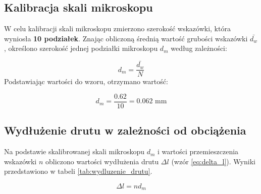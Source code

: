 \documentclass[a4paper,12pt]{article}
\begin{document}
\subsection{Kalibracja skali mikroskopu}

W celu kalibracji skali mikroskopu zmierzono szerokość wskazówki, która wyniosła \textbf{10 podziałek}. Znając obliczoną średnią wartość grubości wskazówki $\bar{d_w}$, określono szerokość jednej podziałki mikroskopu $d_m$ według zależności:

\begin{equation*}
    d_m = \frac{\bar{d_w}}{N}
\end{equation*}
Podstawiając wartości do wzoru, otrzymano wartość:

\begin{equation*}
    d_m = \frac{0.62}{10} = 0.062 \text{ mm}
\end{equation*}

\subsection{Wydłużenie drutu w zależności od obciążenia}

Na podstawie skalibrowanej skali mikroskopu $d_m$ i wartości przemieszczenia wskazówki $n$ obliczono wartości wydłużenia drutu $\Delta l$ (wzór \ref{eq:delta_l}). Wyniki przedstawiono w tabeli \ref{tab:wydluzenie_drutu}.

\begin{equation}
\label{eq:delta_l}
\Delta l = n  d_m 
\end{equation}
\end{document}
